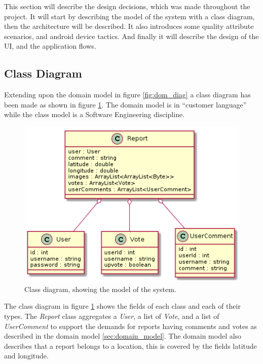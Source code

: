 
This section will describe the design decisions, which was made throughout the project. It will start by describing the model of the system with a class diagram, then the architecture will be described. It also introduces some quality attribute scenarios, and android device tactics. And finally it will describe the design of the UI, and the application flows.


\subsection{Class Diagram}
Extending upon the  domain model in figure \ref{fig:dom_diag} a class diagram has been made as shown in figure \ref{fig:class_diagram}. The domain model is in “customer language” while the class model is a Software Engineering discipline. 

\begin{figure}[hbt]
\centering
\includegraphics[width=.6\textwidth]{images/Class_model_diagram}
\caption{Class diagram, showing the model of the system.} \label{fig:class_diagram}
\end{figure}

The class diagram in figure \ref{fig:class_diagram} shows the fields of each class and each of their types. The \textit{Report} class aggregates a \textit{User}, a list of \textit{Vote}, and a list of \textit{UserComment} to support the demands for reports having comments and votes as described in the domain model \ref{sec:domain_model}. The domain model also describes that a report belongs to a location, this is covered by the fields latitude and longitude. 

%
%


